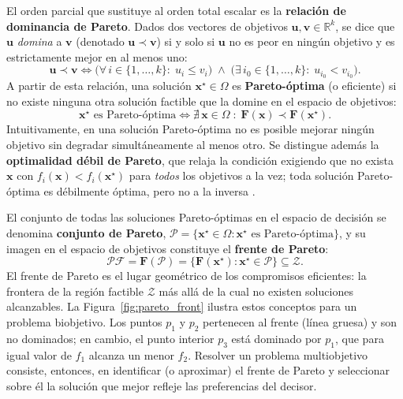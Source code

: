 El orden parcial que sustituye al orden total escalar es la \textbf{relación de dominancia de Pareto}. Dados dos vectores de objetivos $\mathbf{u}, \mathbf{v} \in \mathbb{R}^k$, se dice que $\mathbf{u}$ \textit{domina} a $\mathbf{v}$ (denotado $\mathbf{u} \prec \mathbf{v}$) si y solo si $\mathbf{u}$ no es peor en ningún objetivo y es estrictamente mejor en al menos uno:
\begin{equation} \label{eq:dominance}
	\mathbf{u} \prec \mathbf{v} \iff \bigl(\forall\, i \in \{1, \ldots, k\}:\; u_i \leq v_i\bigr) \;\wedge\; \bigl(\exists\, i_0 \in \{1, \ldots, k\}:\; u_{i_0} < v_{i_0}\bigr).
\end{equation}
A partir de esta relación, una solución $\mathbf{x}^{\star} \in \Omega$ es \textbf{Pareto-óptima} (o eficiente) si no existe ninguna otra solución factible que la domine en el espacio de objetivos:
\begin{equation} \label{eq:pareto_optimal}
	\mathbf{x}^{\star} \text{ es Pareto-óptima} \iff \nexists\, \mathbf{x} \in \Omega \;:\; \mathbf{F}(\mathbf{x}) \prec \mathbf{F}(\mathbf{x}^{\star}).
\end{equation}
Intuitivamente, en una solución Pareto-óptima no es posible mejorar ningún objetivo sin degradar simultáneamente al menos otro. Se distingue además la \textbf{optimalidad débil de Pareto}, que relaja la condición exigiendo que no exista $\mathbf{x}$ con $f_i(\mathbf{x}) < f_i(\mathbf{x}^{\star})$ para \emph{todos} los objetivos a la vez; toda solución Pareto-óptima es débilmente óptima, pero no a la inversa \citep{miettinen1999nonlinear}.

El conjunto de todas las soluciones Pareto-óptimas en el espacio de decisión se denomina \textbf{conjunto de Pareto}, $\mathcal{P} = \{\mathbf{x}^{\star} \in \Omega : \mathbf{x}^{\star} \text{ es Pareto-óptima}\}$, y su imagen en el espacio de objetivos constituye el \textbf{frente de Pareto}:
\begin{equation} \label{eq:pareto_front}
	\mathcal{PF} = \mathbf{F}(\mathcal{P}) = \{\mathbf{F}(\mathbf{x}^{\star}) : \mathbf{x}^{\star} \in \mathcal{P}\} \subseteq \mathcal{Z}.
\end{equation}
El frente de Pareto es el lugar geométrico de los compromisos eficientes: la frontera de la región factible $\mathcal{Z}$ más allá de la cual no existen soluciones alcanzables. La Figura~\ref{fig:pareto_front} ilustra estos conceptos para un problema biobjetivo. Los puntos $p_1$ y $p_2$ pertenecen al frente (línea gruesa) y son no dominados; en cambio, el punto interior $p_3$ está dominado por $p_1$, que para igual valor de $f_1$ alcanza un menor $f_2$. Resolver un problema multiobjetivo consiste, entonces, en identificar (o aproximar) el frente de Pareto y seleccionar sobre él la solución que mejor refleje las preferencias del decisor.

